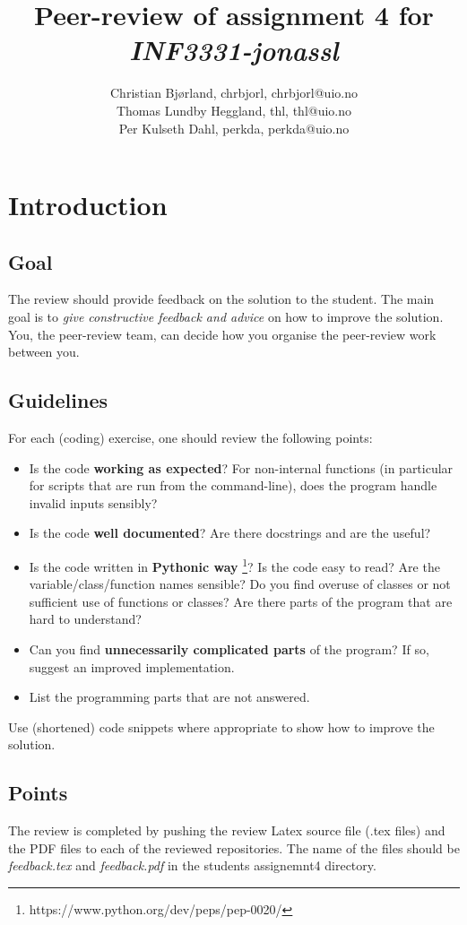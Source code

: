 \documentclass[a4paper]{article}
\title{Peer-review of assignment 4 for \textit{INF3331-jonassl}}
\author{Christian Bjørland, chrbjorl, {chrbjorl@uio.no} \\
 		Thomas Lundby Heggland, thl, {thl@uio.no} \\
		Per Kulseth Dahl, perkda, {perkda@uio.no}}
\begin{document}
\maketitle

\section{Introduction}
\subsection{Goal}
The review should provide feedback on the solution to the student. The main goal is to \emph{give constructive feedback and advice} on how to improve the solution. You, the peer-review team, can decide how you organise the peer-review work between you. 

\subsection{Guidelines}\label{sec:general_review}
For each (coding) exercise, one should review the following points:

\begin{itemize}
  \item Is the code \textbf{working as expected}? For non-internal functions (in particular for scripts that are run from the command-line), does the program handle invalid inputs sensibly?
  \item Is the code \textbf{well documented}? Are there docstrings and are the useful?
  \item Is the code written in \textbf{Pythonic way} \footnote{https://www.python.org/dev/peps/pep-0020/}? Is the code easy to read? Are the variable/class/function names sensible? Do you find overuse of classes or not sufficient use of functions or classes? Are there parts of the program that are hard to understand? 
  \item Can you find \textbf{unnecessarily complicated parts} of the program? If so, suggest an improved implementation.
  \item List the programming parts that are not answered.
\end{itemize}
Use (shortened) code snippets where appropriate to show how to improve the solution. 

\subsection{Points}
The review is completed by pushing the review Latex source file (.tex files) and the PDF files to each of the reviewed repositories. The name of the files should be \emph{feedback.tex} and \emph{feedback.pdf} in the students assignemnt4 directory.
\end{document}
